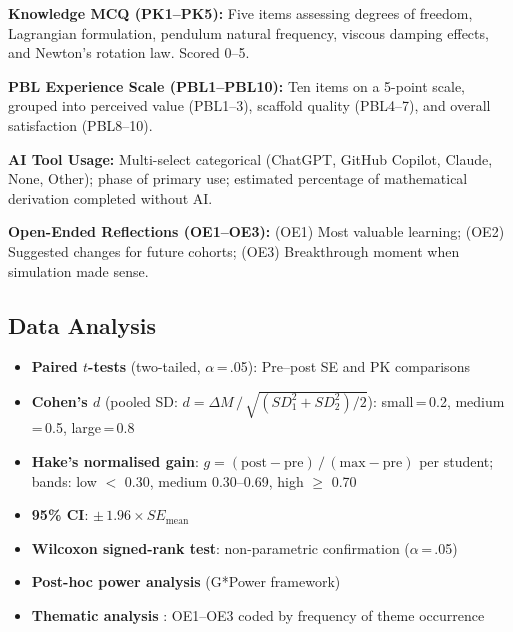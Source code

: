 \documentclass[12pt, a4paper]{article}
\begin{document}
\textbf{Knowledge MCQ (PK1--PK5):} Five items assessing degrees
of freedom, Lagrangian formulation, pendulum natural frequency,
viscous damping effects, and Newton's rotation law. Scored 0--5.

\textbf{PBL Experience Scale (PBL1--PBL10):} Ten items on a
5-point scale, grouped into perceived value (PBL1--3), scaffold
quality (PBL4--7), and overall satisfaction (PBL8--10).

\textbf{AI Tool Usage:} Multi-select categorical (ChatGPT, GitHub
Copilot, Claude, None, Other); phase of primary use; estimated
percentage of mathematical derivation completed without AI.

\textbf{Open-Ended Reflections (OE1--OE3):} (OE1) Most valuable
learning; (OE2) Suggested changes for future cohorts; (OE3)
Breakthrough moment when simulation made sense.

\subsection{Data Analysis}

\begin{itemize}[noitemsep]
  \item \textbf{Paired $t$-tests} (two-tailed, $\alpha$\,=\,.05):
    Pre--post SE and PK comparisons

  \item \textbf{Cohen's $d$} (pooled SD:
    $d = \Delta M \,/\, \sqrt{(SD_1^2 + SD_2^2)/2}$):
    small\,=\,0.2, medium\,=\,0.5, large\,=\,0.8
    \citep{cohen1988statistical}

  \item \textbf{Hake's normalised gain}:
    $g = (\text{post}-\text{pre})\,/\,(\text{max}-\text{pre})$ per
    student; bands: low $<$ 0.30, medium 0.30--0.69, high
    $\geq$ 0.70 \citep{hake1998interactive}

  \item \textbf{95\% CI}: $\pm\,1.96 \times SE_{\text{mean}}$

  \item \textbf{Wilcoxon signed-rank test}: non-parametric
    confirmation ($\alpha$\,=\,.05)

  \item \textbf{Post-hoc power analysis} (G*Power framework)

  \item \textbf{Thematic analysis} \citep{thomas2008methods}:
    OE1--OE3 coded by frequency of theme occurrence
\end{itemize}
\end{document}
